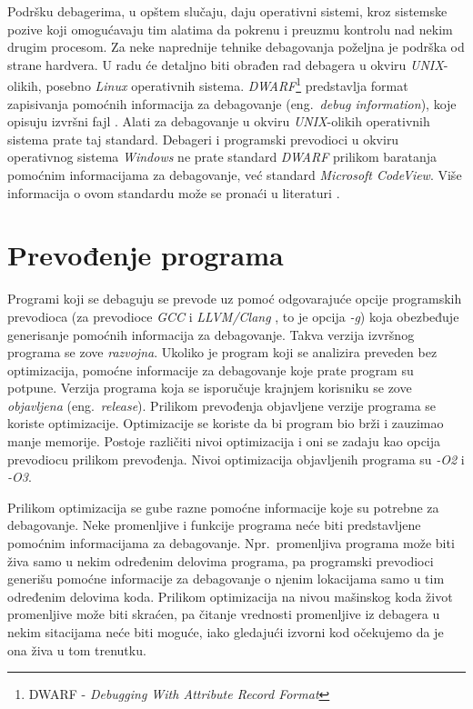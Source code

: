 \documentclass[12pt,oneside]{memoir}
\begin{document}
Podršku debagerima, u opštem slučaju, daju operativni sistemi, kroz sistemske pozive koji omogućavaju tim alatima da pokrenu i preuzmu kontrolu nad nekim drugim procesom. Za neke naprednije tehnike debagovanja poželjna je podrška od strane hardvera. U radu će detaljno biti obrađen rad debagera u okviru \emph{UNIX}-olikih, posebno \emph{Linux} operativnih sistema. \emph{DWARF}\footnote{DWARF - \emph{Debugging With Attribute Record Format}} predstavlja format zapisivanja pomoćnih informacija za debagovanje (eng.~\emph{debug information}), koje opisuju izvršni fajl \cite{DWARF}. Alati za debagovanje u okviru \emph{UNIX}-olikih operativnih sistema prate taj standard. Debageri i programski prevodioci u okviru operativnog sistema \emph{Windows} ne prate standard \emph{DWARF} prilikom baratanja pomoćnim informacijama za debagovanje, već standard \emph{Microsoft CodeView}. Više informacija o ovom standardu može se pronaći u literaturi \cite{CodeView}.

\section{Prevođenje programa}

Programi koji se debaguju se prevode uz pomoć odgovarajuće opcije programskih prevodioca (za prevodioce \emph{GCC} \cite{GCC} i \emph{LLVM/Clang} \cite{LLVM}, to je opcija \emph{-g}) koja obezbeđuje generisanje pomoćnih informacija za debagovanje. Takva verzija izvršnog programa se zove \emph{razvojna}. Ukoliko je program koji se analizira preveden bez optimizacija, pomoćne informacije za debagovanje koje prate program su potpune. Verzija programa koja se isporučuje krajnjem korisniku se zove \emph{objavljena} (eng.~\emph{release}). Prilikom prevođenja objavljene verzije programa se koriste optimizacije. Optimizacije se koriste da bi program bio brži i zauzimao manje memorije. Postoje različiti nivoi optimizacija i oni se zadaju kao opcija prevodiocu prilikom prevođenja. Nivoi optimizacija objavljenih programa su \emph{-O2} i \emph{-O3}.

Prilikom optimizacija se gube razne pomoćne informacije koje su potrebne za debagovanje. Neke promenljive i funkcije programa neće biti predstavljene pomoćnim informacijama za debagovanje. Npr.~promenljiva programa može biti živa samo u nekim određenim delovima programa, pa programski prevodioci generišu pomoćne informacije za debagovanje o njenim lokacijama samo u tim određenim delovima koda. Prilikom optimizacija na nivou mašinskog koda život promenljive može biti skraćen, pa čitanje vrednosti promenljive iz debagera u nekim sitacijama neće biti moguće, iako gledajući izvorni kod očekujemo da je ona živa u tom trenutku.
\end{document}
